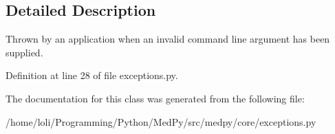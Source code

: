 \subsection{Detailed Description}
Thrown by an application when an invalid command line argument has been supplied. 

Definition at line 28 of file exceptions.py.



The documentation for this class was generated from the following file:\begin{DoxyCompactItemize}
\item 
/home/loli/Programming/Python/MedPy/src/medpy/core/exceptions.py\end{DoxyCompactItemize}
